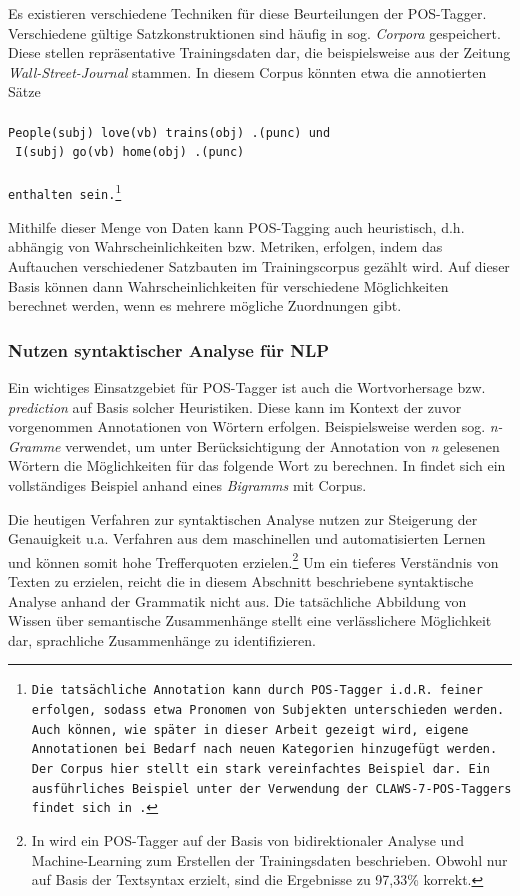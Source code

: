 \documentclass[12pt]{report}
\begin{document}
Es existieren verschiedene Techniken für diese Beurteilungen der POS-Tagger. Verschiedene gültige Satzkonstruktionen sind häufig in sog. \textit{Corpora} gespeichert. Diese stellen repräsentative Trainingsdaten dar, die beispielsweise aus der Zeitung \textit{Wall-Street-Journal} stammen. 
In diesem Corpus könnten etwa die annotierten Sätze
\\
\tt
\\People(subj) love(vb) trains(obj) .(punc)
\rm und\\
\tt
I(subj) go(vb) home(obj) .(punc)\\
\\ \rm
enthalten sein.\footnote{Die tatsächliche Annotation kann durch POS-Tagger i.d.R. feiner erfolgen, sodass etwa Pronomen von Subjekten unterschieden werden. Auch können, wie später in dieser Arbeit gezeigt wird, eigene Annotationen bei Bedarf nach neuen Kategorien hinzugefügt werden. Der Corpus hier stellt ein stark vereinfachtes Beispiel dar. Ein ausführliches Beispiel unter der Verwendung der CLAWS-7-POS-Taggers findet sich in \cite{rs18}.}

Mithilfe dieser Menge von Daten kann POS-Tagging auch heuristisch, d.h. abhängig von Wahrscheinlichkeiten bzw. Metriken, erfolgen, indem das Auftauchen verschiedener Satzbauten im Trainingscorpus gezählt wird. Auf dieser Basis können dann Wahrscheinlichkeiten für verschiedene Möglichkeiten berechnet werden, wenn es mehrere mögliche Zuordnungen gibt. 

\subsubsection{Nutzen syntaktischer Analyse für NLP}
Ein wichtiges Einsatzgebiet für POS-Tagger ist auch die Wortvorhersage bzw. \textit{prediction} auf Basis solcher Heuristiken. Diese kann im Kontext der zuvor vorgenommen Annotationen von Wörtern erfolgen. Beispielsweise werden sog. \textit{n-Gramme} verwendet, um unter Berücksichtigung der Annotation von \textit{n} gelesenen Wörtern die Möglichkeiten für das folgende Wort zu berechnen. In \cite{rs18} findet sich ein vollständiges Beispiel anhand eines \textit{Bigramms} mit Corpus.

Die heutigen Verfahren zur syntaktischen Analyse nutzen zur Steigerung der Genauigkeit u.a. Verfahren aus dem maschinellen und automatisierten Lernen und können somit hohe Trefferquoten erzielen.\footnote{In \cite{she07} wird ein POS-Tagger auf der Basis von bidirektionaler Analyse und Machine-Learning zum Erstellen der Trainingsdaten beschrieben. Obwohl nur auf Basis der Textsyntax erzielt, sind die Ergebnisse zu 97,33\% korrekt.} Um ein tieferes Verständnis von Texten zu erzielen, reicht die in diesem Abschnitt beschriebene syntaktische Analyse anhand der Grammatik nicht aus. Die tatsächliche Abbildung von Wissen über semantische Zusammenhänge stellt eine verlässlichere Möglichkeit dar, sprachliche Zusammenhänge zu identifizieren. 
\end{document}
